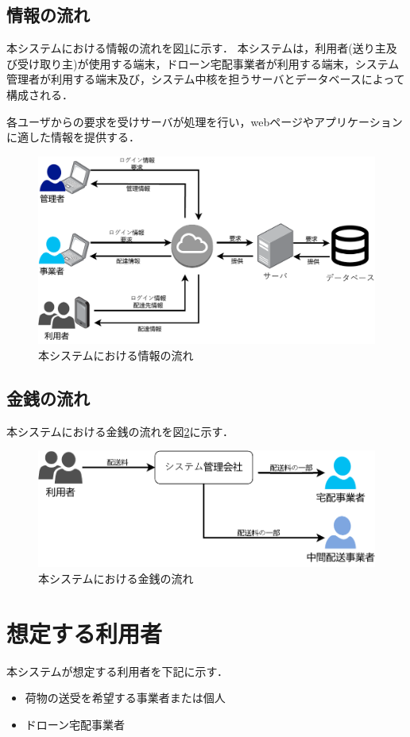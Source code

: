 \documentclass[a4paper, titlepage]{jsarticle}
\begin{document}
\subsection{情報の流れ}
本システムにおける情報の流れを図\ref{fig:info_flow_1}に示す．
本システムは，利用者(送り主及び受け取り主)が使用する端末，ドローン宅配事業者が利用する端末，システム管理者が利用する端末及び，システム中核を担うサーバとデータベースによって構成される．

各ユーザからの要求を受けサーバが処理を行い，webページやアプリケーションに適した情報を提供する．

\begin{figure}[H]
  \centering
  \includegraphics[width=0.6\linewidth]{./info_flow.pdf}
  \caption{本システムにおける情報の流れ}
  \label{fig:info_flow_1}
\end{figure}

\subsection{金銭の流れ}
本システムにおける金銭の流れを図\ref{fig:money_flow_1}に示す．

\begin{figure}[H]
  \centering
  \includegraphics[width=0.6\linewidth]{./money_flow.pdf}
  \caption{本システムにおける金銭の流れ}
  \label{fig:money_flow_1}
\end{figure}


\section{想定する利用者}
本システムが想定する利用者を下記に示す．
\begin{itemize}
\item 荷物の送受を希望する事業者または個人
\item ドローン宅配事業者
\end{itemize}
\end{document}
